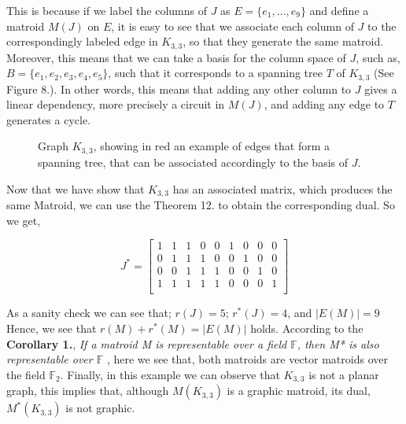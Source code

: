 This is because if we label the columns of $J$ as $E = \{e_1,\dots, e_9\}$ and define a matroid $M(J)$ on $E$, it is easy to see that we associate each column of $J$ to the correspondingly labeled edge in $K_{3,3}$, so that they generate the same matroid. Moreover, this means that we can take a basis for the column space of $J$, such as, $B = \{e_1, e_2, e_3, e_4, e_5\}$, such that it corresponds to a spanning tree $T$ of $K_{3,3}$ (See Figure 8.). In other words, this means that adding any other column to $J$ gives a linear dependency, more precisely a circuit in $M(J)$, and adding any edge to $T$ generates a cycle.
\begin{figure}[H]
    \centering
    \caption{Graph $K_{3,3}$, showing in red an example of edges that form a spanning tree, that can be associated accordingly to the basis of $J$.}
    \label{fig:enter-label}
\end{figure}

Now that we have show that $K_{3,3}$ has an associated matrix, which produces the same Matroid, we can use the Theorem 12. to obtain the corresponding dual. 
So we get, 
\begin{figure}[H]
  $$J^*=\begin{bmatrix} 
1 & 1 & 1 & 0 & 0 & 1 & 0 & 0 & 0\\
0 & 1 & 1 & 1 & 0 & 0 & 1 & 0 & 0\\
0 & 0 & 1 & 1 & 1 & 0 & 0 & 1 & 0\\
1 & 1 & 1 & 1 & 1 & 0 & 0 & 0 & 1\\
\end{bmatrix}$$
\end{figure}

As a sanity check we can see that;
$r(J) = 5$;  $r^*(J)=4$, and $|E(M)|=9$
Hence, we see that $r(M) + r^*(M) = |E(M)|$ holds.
According to the \textbf{Corollary 1.}, \textit{If a matroid \textit{M} is \textit{representable} over a field $\mathbb{F}$, then \textit{M*} is also representable over $\mathbb{F}$} , here we see that, both matroids are vector matroids over the field $\mathbb{F}_2$. 
Finally, in this example we can observe that $K_{3,3}$ is not a planar graph, this implies that, although $M(K_{3,3})$ is a graphic matroid, its dual, $M^*(K_{3,3})$ is not graphic.

